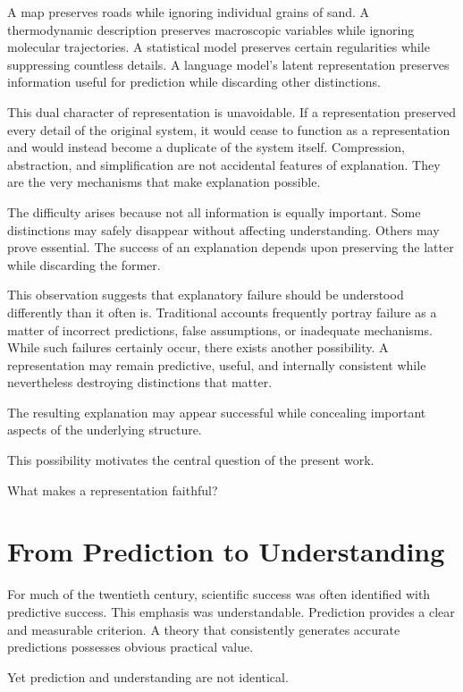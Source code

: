 \documentclass[11pt,oneside,openany]{book}
\begin{document}
A map preserves roads while ignoring individual grains of sand. A thermodynamic description preserves macroscopic variables while ignoring molecular trajectories. A statistical model preserves certain regularities while suppressing countless details. A language model's latent representation preserves information useful for prediction while discarding other distinctions.

This dual character of representation is unavoidable. If a representation preserved every detail of the original system, it would cease to function as a representation and would instead become a duplicate of the system itself. Compression, abstraction, and simplification are not accidental features of explanation. They are the very mechanisms that make explanation possible.

The difficulty arises because not all information is equally important. Some distinctions may safely disappear without affecting understanding. Others may prove essential. The success of an explanation depends upon preserving the latter while discarding the former.

This observation suggests that explanatory failure should be understood differently than it often is. Traditional accounts frequently portray failure as a matter of incorrect predictions, false assumptions, or inadequate mechanisms. While such failures certainly occur, there exists another possibility. A representation may remain predictive, useful, and internally consistent while nevertheless destroying distinctions that matter.

The resulting explanation may appear successful while concealing important aspects of the underlying structure.

This possibility motivates the central question of the present work.

What makes a representation faithful?

\section{From Prediction to Understanding}

For much of the twentieth century, scientific success was often identified with predictive success. This emphasis was understandable. Prediction provides a clear and measurable criterion. A theory that consistently generates accurate predictions possesses obvious practical value.

Yet prediction and understanding are not identical.
\end{document}
